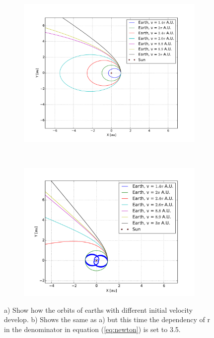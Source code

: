 \begin{figure}[H]
    \centering
    \begin{subfigure}{0.5\textwidth}
        \centering
        \includegraphics[width=\linewidth]{result/bilder/escape-velocity.pdf}
    	\caption{}
    \end{subfigure}%
    ~ 
    \begin{subfigure}{0.5\textwidth}
        \centering
        \includegraphics[width=\linewidth]{result/bilder/escape-velocity-r25.pdf}
        \caption{}
    \end{subfigure}
    \caption{a) Show how the orbits of earths with different initial velocity develop. b) Shows the same as a) but this time the dependency of r in the denominator in equation (\ref{eq:newton}) is set to 3.5.}
    \label{fig:escape-velocity-low}
\end{figure}



